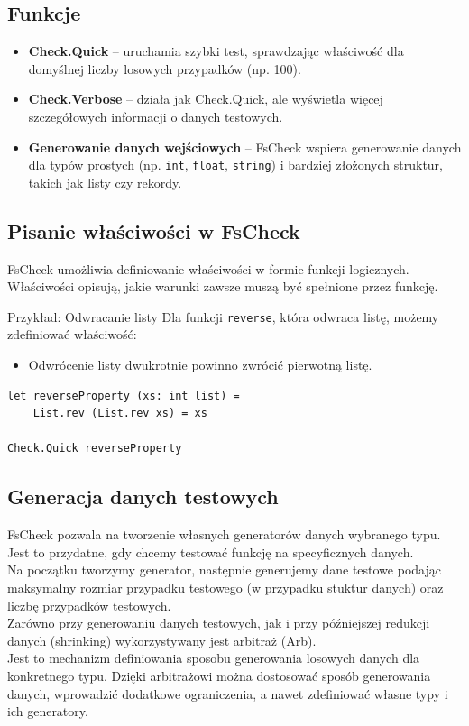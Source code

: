\subsection{Funkcje}
\begin{itemize}
    \item \textbf{Check.Quick} -- uruchamia szybki test, sprawdzając właściwość dla domyślnej liczby losowych przypadków (np. 100).
    \item \textbf{Check.Verbose} -- działa jak Check.Quick, ale wyświetla więcej szczegółowych informacji o danych testowych.
    \item \textbf{Generowanie danych wejściowych} -- FsCheck wspiera generowanie danych dla typów prostych (np. \texttt{int}, \texttt{float}, \texttt{string}) i bardziej złożonych struktur, takich jak listy czy rekordy.
\end{itemize}

\subsection{Pisanie właściwości w FsCheck}

FsCheck umożliwia definiowanie właściwości w formie funkcji logicznych. Właściwości opisują, jakie warunki zawsze muszą być spełnione przez funkcję.

Przykład: Odwracanie listy
Dla funkcji \texttt{reverse}, która odwraca listę, możemy zdefiniować właściwość:
\begin{itemize}
    \item Odwrócenie listy dwukrotnie powinno zwrócić pierwotną listę.
\end{itemize}

\lstset{language=FSharp, basicstyle=\scriptsize}
\begin{lstlisting}[frame=single,caption={Definicja właściwości dla odwracania listy},label=kod:listingA]
let reverseProperty (xs: int list) =
    List.rev (List.rev xs) = xs

Check.Quick reverseProperty
\end{lstlisting}

\subsection{Generacja danych testowych}

FsCheck pozwala na tworzenie własnych generatorów danych wybranego typu. Jest to przydatne, gdy chcemy testować funkcję na specyficznych danych. \\
Na początku tworzymy generator, następnie generujemy dane testowe podając maksymalny rozmiar przypadku testowego (w przypadku stuktur danych) oraz liczbę przypadków testowych.\\
Zarówno przy generowaniu danych testowych, jak i przy późniejszej redukcji danych (shrinking) wykorzystywany jest arbitraż (Arb).\\
Jest to mechanizm definiowania sposobu generowania losowych danych dla konkretnego typu. Dzięki arbitrażowi można dostosować sposób generowania danych, wprowadzić dodatkowe ograniczenia, a nawet zdefiniować własne typy i ich generatory.

